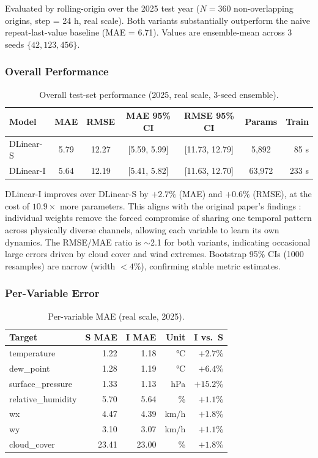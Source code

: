 Evaluated by rolling-origin over the 2025 test year ($N = 360$ non-overlapping
origins, step = 24 h, real scale). Both variants substantially outperform the
naive repeat-last-value baseline (MAE = 6.71). Values are ensemble-mean across
3 seeds $\{42, 123, 456\}$.

\subsubsection{Overall Performance}

\begin{table}[H]
\centering
\caption{Overall test-set performance (2025, real scale, 3-seed ensemble).}
\label{tab:dlinear-overall}
\begin{tabular}{lcccccr}
\toprule
\textbf{Model} & \textbf{MAE} & \textbf{RMSE} & \textbf{MAE 95\% CI} &
\textbf{RMSE 95\% CI} & \textbf{Params} & \textbf{Train} \\
\midrule
DLinear-S & 5.79 & 12.27 & [5.59, 5.99] & [11.73, 12.79] & 5,892   & 85 s \\
DLinear-I & 5.64 & 12.19 & [5.41, 5.82] & [11.63, 12.70] & 63,972  & 233 s \\
\bottomrule
\end{tabular}
\end{table}

DLinear-I improves over DLinear-S by $+2.7\%$ (MAE) and $+0.6\%$ (RMSE), at the
cost of $10.9\times$ more parameters. This aligns with the original paper's
findings \citep{zeng2023dlinear}: individual weights remove the forced compromise
of sharing one temporal pattern across physically diverse channels, allowing each
variable to learn its own dynamics. The RMSE/MAE ratio is $\sim$2.1 for both
variants, indicating occasional large errors driven by cloud cover and wind
extremes. Bootstrap 95\% CIs (1000 resamples) are narrow (width $<4\%$),
confirming stable metric estimates.

\subsubsection{Per-Variable Error}

\begin{table}[H]
\centering
\caption{Per-variable MAE (real scale, 2025).}
\label{tab:dlinear-pervar}
\begin{tabular}{lrrrr}
\toprule
\textbf{Target} & \textbf{S MAE} & \textbf{I MAE} & \textbf{Unit} & \textbf{I vs.\ S} \\
\midrule
temperature       & 1.22 & 1.18 & °C   & $+2.7\%$ \\
dew\_point        & 1.28 & 1.19 & °C   & $+6.4\%$ \\
surface\_pressure & 1.33 & 1.13 & hPa  & $+15.2\%$ \\
relative\_humidity& 5.70 & 5.64 & \%   & $+1.1\%$ \\
wx                & 4.47 & 4.39 & km/h & $+1.8\%$ \\
wy                & 3.10 & 3.07 & km/h & $+1.1\%$ \\
cloud\_cover      & 23.41& 23.00& \%   & $+1.8\%$ \\
\bottomrule
\end{tabular}
\end{table}

